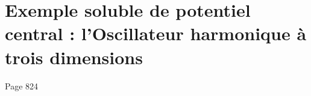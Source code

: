 \chapter{Exemple soluble de potentiel central : l'Oscillateur harmonique à trois dimensions}
\label{chapter:exemple_soluble_potential_central_oscillateur_harmonique_trois_dim}
Page 824
